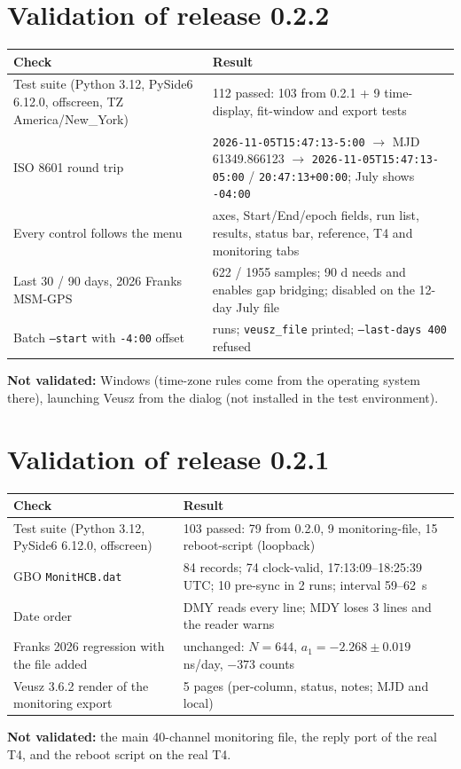 \documentclass[11pt,a4paper]{article}
\begin{document}
\section{Validation of release 0.2.2}
\begin{center}
\small
\begin{tabular}{@{}p{.42\linewidth}p{.5\linewidth}@{}}
\toprule
Check & Result\\
\midrule
Test suite (Python 3.12, PySide6 6.12.0, offscreen, TZ America/New\_York) & 112 passed: 103 from 0.2.1 + 9 time-display, fit-window and export tests\\
ISO 8601 round trip & \texttt{2026-11-05T15:47:13-5:00} $\rightarrow$ MJD 61349.866123 $\rightarrow$ \texttt{2026-11-05T15:47:13-05:00} / \texttt{20:47:13+00:00}; July shows \texttt{-04:00}\\
Every control follows the menu & axes, Start/End/epoch fields, run list, results, status bar, reference, T4 and monitoring tabs\\
Last 30 / 90 days, 2026 Franks MSM-GPS & 622 / 1955 samples; 90 d needs and enables gap bridging; disabled on the 12-day July file\\
Batch \texttt{--start} with \texttt{-4:00} offset & runs; \texttt{veusz\_file} printed; \texttt{--last-days 400} refused\\
\bottomrule
\end{tabular}
\end{center}
\textbf{Not validated:} Windows (time-zone rules come from the operating system there), launching
Veusz from the dialog (not installed in the test environment).

\section{Validation of release 0.2.1}
\begin{center}
\small
\begin{tabular}{@{}p{.42\linewidth}p{.5\linewidth}@{}}
\toprule
Check & Result\\
\midrule
Test suite (Python 3.12, PySide6 6.12.0, offscreen) & 103 passed: 79 from 0.2.0, 9 monitoring-file, 15 reboot-script (loopback)\\
GBO \texttt{MonitHCB.dat} & 84 records; 74 clock-valid, 17:13:09--18:25:39 UTC; 10 pre-sync in 2 runs; interval 59--62~s\\
Date order & DMY reads every line; MDY loses 3 lines and the reader warns\\
Franks 2026 regression with the file added & unchanged: $N=644$, $a_1=-2.268\pm0.019$ ns/day, $-373$ counts\\
Veusz 3.6.2 render of the monitoring export & 5 pages (per-column, status, notes; MJD and local)\\
\bottomrule
\end{tabular}
\end{center}
\textbf{Not validated:} the main 40-channel monitoring file, the reply port of the real T4, and the
reboot script on the real T4.
\end{document}
